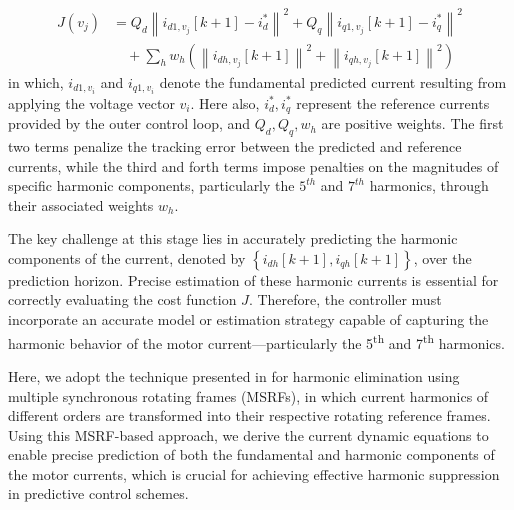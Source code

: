 \begin{equation}
\begin{aligned}
J(v_j) &=
Q_d \left\| i_{d1,v_j}[k+1] - i_d^{*} \right\|^2
+ Q_q \left\| i_{q1,v_j}[k+1] - i_q^{*} \right\|^2 \\
&\quad
+ \sum_{h} w_h \left(
\left\| i_{dh,v_j}[k+1] \right\|^2
+ \left\| i_{qh,v_j}[k+1] \right\|^2
\right)
\end{aligned}
\label{eq:cost_function_total}
\end{equation}
in which, \( i_{d1,v_i} \) and \( i_{q1,v_i} \) denote the fundamental predicted current resulting from applying the voltage vector \( v_i \). Here also, ${i_{d}^*,i_{q}^*}$ represent the reference currents provided by the outer control loop, and ${Q_d,Q_q, w_h}$ are positive  weights. The first two terms penalize the tracking error between the predicted and reference currents, while the third and forth terms impose penalties on the magnitudes of specific harmonic components, particularly the $5^{th}$ and $7^{th}$ harmonics, through their associated weights $w_h$. 
\par
The key challenge at this stage lies in accurately predicting the harmonic components of the current, denoted by $\left\lbrace i_{dh}[k+1], i_{qh}[k+1]\right\rbrace $, over the prediction horizon. Precise estimation of these harmonic currents is essential for correctly evaluating the cost function $J$. Therefore, the controller must incorporate an accurate model or estimation strategy capable of capturing the harmonic behavior of the motor current—particularly the 5\textsuperscript{th} and 7\textsuperscript{th} harmonics.

Here, we adopt the technique presented in \cite{harmonics_MSRF,MSRF_2016} for harmonic elimination using multiple synchronous rotating frames (MSRFs), in which current harmonics of different orders are transformed into their respective rotating reference frames. Using this MSRF-based approach, we derive the current dynamic equations to enable precise prediction of both the fundamental and harmonic components of the motor currents, which is crucial for achieving effective harmonic suppression in predictive control schemes.


